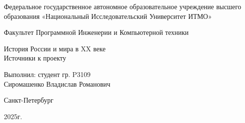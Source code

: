 \begin{center}
	Федеральное государственное автономное образовательное учреждение высшего образования «Национальный Исследовательский Университет ИТМО»
	
	\vspace{1em}
	Факультет Программной Инженерии и Компьютерной техники
	
	\vspace{20em}
	
	{\Large История России и мира в XX веке}\\[1em]
	{\Large Источники к проекту}\\[1em]
\end{center}

\vspace{12em}

\begin{flushright}
	Выполнил:
	студент гр. P3109\\
	Сиромашенко Владислав Романович\\
\end{flushright}
\vspace{9em}
\vspace{\fill}

\begin{center}
	Санкт-Петербург
	
	2025г.
\end{center}